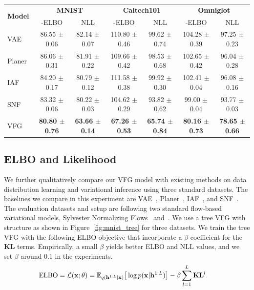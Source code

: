 \documentclass[sigconf, anonymous, review]{acmart}
\theoremstyle{plain}
\theoremstyle{definition}
\theoremstyle{remark}
\begin{document}
\begin{table}[t]
\centering
\label{tab:elbo}
\begin{tabular}{l | c  c   c  c  c  c }
\hline
 \multirow{2}{0nc}{\textbf{Model}} & \multicolumn{2}{c}{\textbf{MNIST}} & \multicolumn{2}{c}{\textbf{Caltech101}} & \multicolumn{2}{c}{\textbf{Omniglot}} \\
 & -ELBO & NLL  &  -ELBO & NLL  & -ELBO & NLL  \\
\hline
 VAE~\cite{kingma2013auto} & 86.55 $\pm$ 0.06  & 82.14 $\pm$ 0.07& 110.80 $\pm$ 0.46 & 99.62 $\pm$ 0.74 & 104.28 $\pm$ 0.39 & 97.25 $\pm$ 0.23 \\
Planer~\cite{rezende2015variational} & 86.06 $\pm$ 0.31 & 81.91 $\pm$ 0.22 & 109.66 $\pm$ 0.42 & 98.53 $\pm$ 0.68 & 102.65 $\pm$ 0.42 & 96.04 $\pm$ 0.28 \\
IAF~\cite{kingma2016improving} & 84.20 $\pm$ 0.17& 80.79 $\pm$ 0.12 & 111.58 $\pm$ 0.38 & 99.92 $\pm$ 0.30 & 102.41 $\pm$ 0.04 & 96.08 $\pm$ 0.16 \\
SNF~\cite{berg2018sylvester} & 83.32 $\pm$ 0.06 & 80.22 $\pm$ 0.03 & 104.62 $\pm$ 0.29 & 93.82 $\pm$ 0.62 & 99.00 $\pm$ 0.04 & 93.77 $\pm$ 0.03 \\
\hline
VFG &\textbf{80.80 $\pm$ 0.76} & \textbf{63.66 $\pm$ 0.14} & \textbf{67.26 $\pm$ 0.53} & \textbf{65.74 $\pm$ 0.84}  &\textbf{80.16 $\pm$ 0.73 } & \textbf{78.65 $\pm$ 0.66}\\  
\hline
\end{tabular}
\vspace{-0.1in}
\end{table}

\subsection{ELBO and Likelihood}\label{sec:exp:elbo}
We further qualitatively compare our VFG model with existing methods on data distribution learning and  variational inference using three standard datasets. The baselines we compare in this experiment are VAE~\cite{kingma2013auto}, Planer~\cite{rezende2015variational},  IAF~\cite{kingma2016improving}, and SNF~\cite{berg2018sylvester}. 
The evaluation datasets and setup are following two standard flow-based variational models, Sylvester Normalizing Flows~\cite{berg2018sylvester} and~\cite{rezende2015variational}.  
We use a tree VFG with structure as shown in Figure~\ref{fig:mnist_tree} for three datasets. 
We train the tree VFG  with the following ELBO objective that incorporate a $\beta$ coefficient for the $\mathbf{KL}$ terms. 
Empirically, a small $\beta$ yields better ELBO and NLL values, and we set $\beta$ around 0.1 in the experiments. 
\begin{align} \notag %
&\text{ELBO}= \mathcal{L}(\mathbf{x}; \theta) 
    = \mathbb{E}_{q(\mathbf{h}^{1:L}|\mathbf{x})}\big[ \log p(\mathbf{x}|\mathbf{h}^{1:L})  \big] - \beta\sum_{l=1}^{L} \mathbf{KL}^l.
\end{align}
\end{document}
